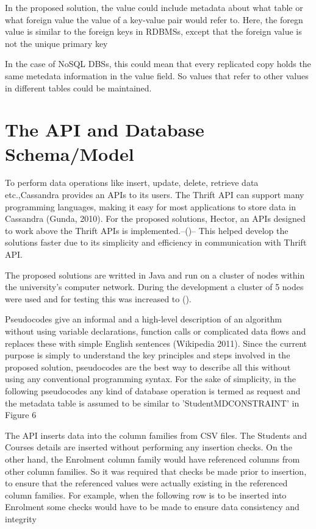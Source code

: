 In the proposed solution, the value could include metadata about what table or
what foreign value the value of a key-value pair would refer to. Here, the
foregn value is similar to the foreign keys in RDBMSs, except that the foreign
value is not the unique primary key

In the case of NoSQL DBSs, this could mean that every replicated copy holds the
same metedata information in the value field. So values that refer to other
values in different tables could be maintained.

\section{The API and Database Schema/Model}\label{s:api}

To perform data operations like insert, update, delete, retrieve data
etc.,Cassandra provides an \acp{API} to its users. The Thrift API can support
many programming languages, making it easy for most applications to store data in
Cassandra (Gunda, 2010). For the proposed solutions, Hector, an \acp{API}
designed to work above the Thrift \acp{API} is implemented.--()-- This helped develop the solutions faster due to its simplicity and
efficiency in communication with Thrift \ac{API}.

The proposed solutions are writted in Java and run on a cluster
of nodes within the university's computer network. During the development a
cluster of 5 nodes were used and for testing this was increased to
().

Pseudocodes give an informal and a high-level description of an algorithm
without using variable declarations, function calls or complicated data flows
and replaces these with simple English sentences (Wikipedia 2011). Since the
current purpose is simply to understand the key principles and steps involved in
the proposed solution, pseudocodes are the best way to describe all this without
using any conventional programming syntax. For the sake of simplicity, in the
following pseudocodes any kind of database operation is termed as request and
the metadata table is assumed to be similar to 'StudentMDCONSTRAINT' in Figure
6

The API inserts data into the column families from CSV files. The Students and
Courses details are inserted without performing any insertion checks. On the
other hand, the Enrolment column family would have referenced columns from other
column families. So it was required that checks be made prior to insertion, to
ensure that the referenced values were actually existing in the referenced
column families. For example, when the following row is to be inserted into
Enrolment some checks would have to be made to ensure data consistency and
integrity

